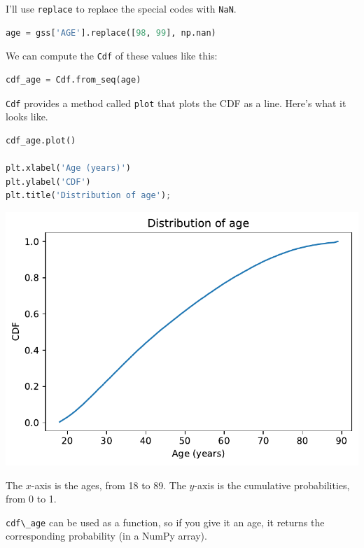 I'll use \passthrough{\lstinline!replace!} to replace the special codes
with \passthrough{\lstinline!NaN!}.

\begin{lstlisting}[language=Python]
age = gss['AGE'].replace([98, 99], np.nan)
\end{lstlisting}

We can compute the \passthrough{\lstinline!Cdf!} of these values like
this:

\begin{lstlisting}[language=Python]
cdf_age = Cdf.from_seq(age)
\end{lstlisting}

\passthrough{\lstinline!Cdf!} provides a method called
\passthrough{\lstinline!plot!} that plots the CDF as a line. Here's what
it looks like.

\begin{lstlisting}[language=Python]
cdf_age.plot()

plt.xlabel('Age (years)')
plt.ylabel('CDF')
plt.title('Distribution of age');
\end{lstlisting}

\begin{center}
\includegraphics[scale=0.75]{chapters/08_distributions_files/08_distributions_68_0.pdf}
\end{center}

The \(x\)-axis is the ages, from 18 to 89. The \(y\)-axis is the
cumulative probabilities, from 0 to 1.

\passthrough{\lstinline!cdf\_age!} can be used as a function, so if you
give it an age, it returns the corresponding probability (in a NumPy
array).

